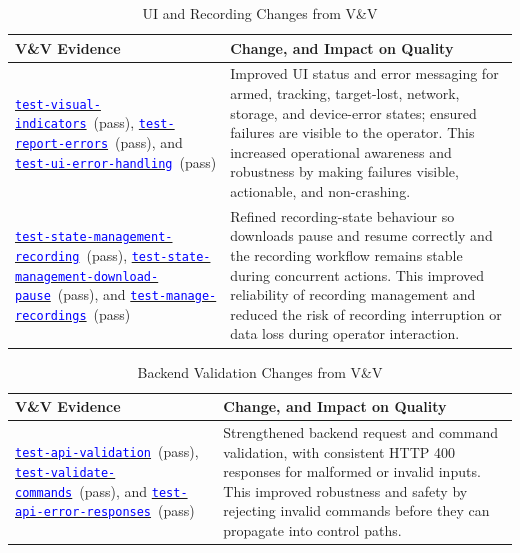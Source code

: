 \documentclass[12pt, titlepage]{article}
\newcommand{\tid}[1]{\hyperlink{tid:#1}{\textcolor{blue}{\texttt{#1}}}}
\newcommand{\tManageRecordings}{\tid{test-manage-recordings}}
\newcommand{\tVisualIndicators}{\tid{test-visual-indicators}}
\newcommand{\tReportErrors}{\tid{test-report-errors}}
\newcommand{\tUIErrorHandling}{\tid{test-ui-error-handling}}
\newcommand{\tStateRecording}{\tid{test-state-management-recording}}
\newcommand{\tDownloadPause}{\tid{test-state-management-download-pause}}
\newcommand{\tAPIValidation}{\tid{test-api-validation}}
\newcommand{\tValidateCommands}{\tid{test-validate-commands}}
\newcommand{\tAPIErrorResponses}{\tid{test-api-error-responses}}
\begin{document}
\begin{table}[H]
  \centering
  \caption{UI and Recording Changes from V\&V}
  \label{TblChangesDueToTestingB}
  \begin{tabularx}{\textwidth}{|>{\raggedright\arraybackslash}p{5cm}|X|}
    \hline
    \textbf{V\&V Evidence}                                                            & \textbf{Change, and Impact on Quality} \\
    \hline
    \tVisualIndicators\ (pass), \tReportErrors\ (pass), and \tUIErrorHandling\ (pass) &
    Improved UI status and error messaging for armed, tracking, target-lost,
    network, storage, and device-error states; ensured failures are visible to
    the operator. This increased operational awareness and robustness by making
    failures visible, actionable, and non-crashing.                                                                            \\
    \hline
    \tStateRecording\ (pass), \tDownloadPause\ (pass), and \tManageRecordings\ (pass) &
    Refined recording-state behaviour so downloads pause and resume correctly
    and the recording workflow remains stable during concurrent actions. This
    improved reliability of recording management and reduced the risk of
    recording interruption or data loss during operator interaction.                                                           \\
    \hline
  \end{tabularx}
\end{table}

\begin{table}[H]
  \centering
  \caption{Backend Validation Changes from V\&V}
  \label{TblChangesDueToTestingC}
  \begin{tabularx}{\textwidth}{|>{\raggedright\arraybackslash}p{5cm}|X|}
    \hline
    \textbf{V\&V Evidence}                                                               & \textbf{Change, and Impact on Quality} \\
    \hline
    \tAPIValidation\ (pass), \tValidateCommands\ (pass), and \tAPIErrorResponses\ (pass) &
    Strengthened backend request and command validation, with consistent HTTP
    400 responses for malformed or invalid inputs. This improved robustness and
    safety by rejecting invalid commands before they can propagate into control
    paths.                                                                                                                        \\
    \hline
  \end{tabularx}
\end{table}
\end{document}
